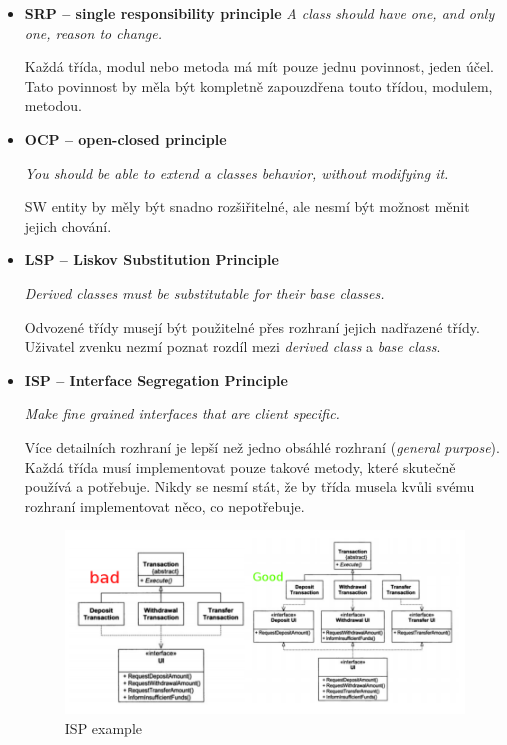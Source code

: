 \documentclass{szzclass}
\begin{document}
\begin{itemize}
      \item \textbf{SRP -- single responsibility principle}
      \textit{A class should have one, and only one, reason to change.}

      Každá třída, modul nebo metoda má mít pouze jednu povinnost, jeden účel.
      Tato povinnost by měla být kompletně zapouzdřena touto třídou, modulem, metodou.

      \item \textbf{OCP -- open-closed principle}

      \textit{You should be able to extend a classes behavior, without modifying it.}

      SW entity by měly být snadno rozšiřitelné, ale nesmí být možnost měnit jejich chování.

      \item \textbf{LSP -- Liskov Substitution Principle}

      \textit{Derived classes must be substitutable for their base classes.}

      Odvozené třídy musejí být použitelné přes rozhraní jejich nadřazené třídy.
      Uživatel zvenku nezmí poznat rozdíl mezi \textit{derived class} a \textit{base class}.

      \item \textbf{ISP -- Interface Segregation Principle}

      \textit{Make fine grained interfaces that are client specific.}

      Více detailních rozhraní je lepší než jedno obsáhlé rozhraní (\textit{general purpose}).
      Každá třída musí implementovat pouze takové metody, které skutečně používá a potřebuje.
      Nikdy se nesmí stát, že by třída musela kvůli svému rozhraní implementovat něco, co nepotřebuje.
      \begin{figure}[ht]
            \centering
            \includegraphics[width=1\textwidth]{topics/bi-wsi-si-9/isp.png}
            \caption{ISP example}
      \end{figure}


\end{itemize}
\end{document}
